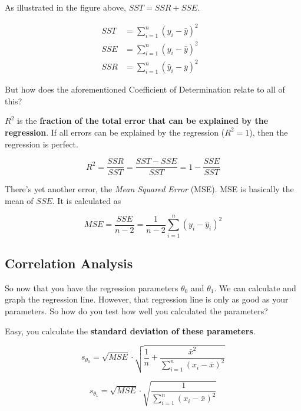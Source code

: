 \documentclass[11pt]{article}
\begin{document}
\vspace{10px}

As illustrated in the figure above, $SST = SSR + SSE$.

\begin{align}
    SST & = \sum^{n}_{i=1}(y_{i}-\bar y)^2        \\
    SSE & = \sum^{n}_{i=1}(y_{i}-\hat y)^2      & \\
    SSR & = \sum^{n}_{i=1}(\hat y_{i}-\bar y)^2
\end{align}


But how does the aforementioned Coefficient of Determination relate to all of this?

$R^2$ is the \textbf{fraction of the total error that can be explained by the regression}. If all errors can be explained by the regression ($R^2 = 1$), then the regression is perfect.

\begin{equation}
    R^2 = \frac{SSR}{SST} = \frac{SST-SSE}{SST} = 1 - \frac{SSE}{SST}
\end{equation}

\vspace{10px}

There's yet another error, the \textit{Mean Squared Error} (MSE). MSE is basically the mean of $SSE$. It is calculated as

\begin{equation}
    MSE = \frac{SSE}{n-2} = \frac{1}{n-2}\sum_{i=1}^{n}(y_{i}-\hat{y}^{}_{i})^2
\end{equation}

\newpage

\subsection{Correlation Analysis}

So now that you have the regression parameters $\theta^{}_{0}$ and $\theta^{}_{1}$. We can calculate and graph the regression line. However, that regression line is only as good as your parameters. So how do you test how well you calculated the parameters?

Easy, you calculate the \textbf{standard deviation of these parameters}.

\begin{equation}
    s_{\theta_{0}} = \sqrt{MSE} \cdot \sqrt{\frac{1}{n} + \frac{\bar{x}^2}{\sum_{i=1}^{n}{(x_i-\bar{x})^2}}}
\end{equation}

\begin{equation}
    s_{\theta_{1}} = \sqrt{MSE}\cdot \sqrt{\frac{1}{\sum_{i=1}^{n}{(x_i-\bar{x})^2}}}
\end{equation}
\end{document}

